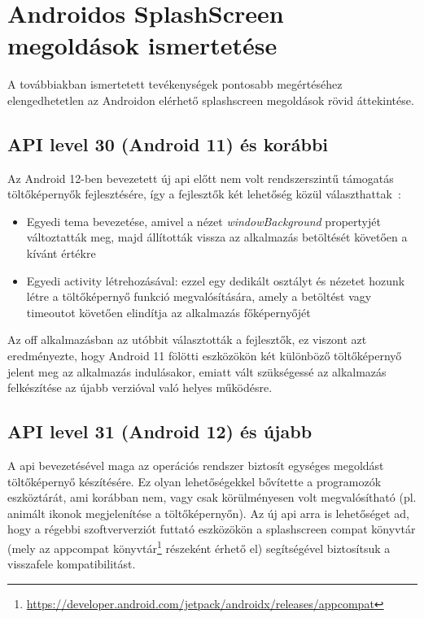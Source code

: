 \chapter{Androidos SplashScreen megoldások ismertetése}


A továbbiakban ismertetett tevékenységek pontosabb megértéséhez elengedhetetlen
az Androidon elérhető \gls{splashscreen} megoldások rövid áttekintése.

\section{API level 30 (Android 11) és korábbi}
Az Android 12-ben bevezetett új \acrshort{api} előtt nem volt rendszerszintű támogatás töltőképernyők
fejlesztésére, így a fejlesztők két lehetőség közül választhattak~\cite{splashscreenmigration}:
\begin{itemize}
 \item Egyedi \gls{tema} bevezetése, amivel a nézet \textit{windowBackground} propertyjét változtatták meg,
 majd állították vissza az alkalmazás betöltését követően a kívánt értékre
 \item Egyedi \Gls{activity} létrehozásával: ezzel egy dedikált osztályt és nézetet hozunk létre
 a töltőképernyő funkció megvalósítására, amely a betöltést vagy timeoutot követően elindítja
 az alkalmazás főképernyőjét %
\end{itemize}


Az \acrlong{off} alkalmazásban az utóbbit választották a fejlesztők, ez viszont azt eredményezte,
hogy Android 11 fölötti eszközökön két különböző töltőképernyő jelent meg az alkalmazás indulásakor,
emiatt vált szükségessé az alkalmazás felkészítése az újabb verzióval való helyes működésre.

\section{API level 31 (Android 12) és újabb}
A  \acrshort{api} bevezetésével maga az operációs rendszer biztosít egységes megoldást
töltőképernyő készítésére. Ez olyan lehetőségekkel bővítette a programozók eszköztárát, ami korábban
nem, vagy csak körülményesen volt megvalósítható (pl. animált ikonok megjelenítése
a töltőképernyőn).
Az új \acrshort{api} arra is lehetőséget ad, hogy a régebbi szoftververziót futtató eszközökön a \gls{splashscreen}
compat könyvtár (mely az \gls{appcompat} könyvtár\footnote{\url{https://developer.android.com/jetpack/androidx/releases/appcompat}} részeként érhető el)
segítségével biztosítsuk a visszafele kompatibilitást.
